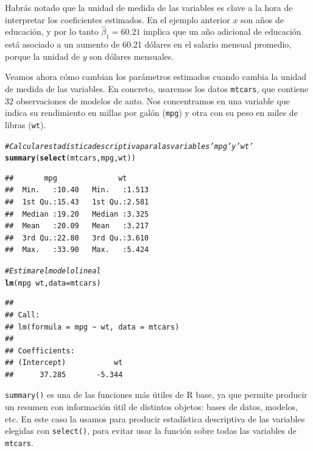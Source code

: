 \documentclass[12pt]{report}\usepackage[]{graphicx}\usepackage[]{color}
\makeatletter
\newcommand{\hlcom}[1]{\textcolor[rgb]{0.678,0.584,0.686}{\textit{#1}}}%
\newcommand{\hlopt}[1]{\textcolor[rgb]{0,0,0}{#1}}%
\newcommand{\hlstd}[1]{\textcolor[rgb]{0.345,0.345,0.345}{#1}}%
\newcommand{\hlkwc}[1]{\textcolor[rgb]{0.333,0.667,0.333}{#1}}%
\newcommand{\hlkwd}[1]{\textcolor[rgb]{0.737,0.353,0.396}{\textbf{#1}}}%
\newenvironment{kframe}{%
 \def\at@end@of@kframe{}%
 \ifinner\ifhmode%
  \def\at@end@of@kframe{\end{minipage}}%
  \begin{minipage}{\columnwidth}%
 \fi\fi%
 \def\FrameCommand##1{\hskip\@totalleftmargin \hskip-\fboxsep
 \colorbox{shadecolor}{##1}\hskip-\fboxsep
     \hskip-\linewidth \hskip-\@totalleftmargin \hskip\columnwidth}%
 \MakeFramed {\advance\hsize-\width
   \@totalleftmargin\z@ \linewidth\hsize
   \@setminipage}}%
 {\par\unskip\endMakeFramed%
 \at@end@of@kframe}
\newenvironment{knitrout}{}{} %
\makeatother
\begin{document}
Habrás notado que la unidad de medida de las variables es clave a la hora de interpretar los coeficientes estimados. En el ejemplo anterior $x$ son años de educación, y por lo tanto $\hat\beta_1 = 60.21$ implica que un año adicional de educación está asociado a un aumento de 60.21 dólares en el salario mensual promedio, porque la unidad de $y$ son dólares mensuales.

Veamos ahora cómo cambian los parámetros estimados cuando cambia la unidad de medida de las variables.
En concreto, usaremos los datos \verb|mtcars|, que contiene 32 observaciones de modelos de auto.
Nos concentramos en una variable que indica su rendimiento en millas por galón (\verb|mpg|) y otra con su peso en miles de libras (\verb|wt|).

\begin{knitrout}
\color{fgcolor}\begin{kframe}
\begin{alltt}
\hlcom{# Calcular estadística descriptiva para las variables 'mpg' y 'wt'}
\hlkwd{summary}\hlstd{(}\hlkwd{select}\hlstd{(mtcars, mpg, wt))}
\end{alltt}
\begin{verbatim}
##       mpg              wt       
##  Min.   :10.40   Min.   :1.513  
##  1st Qu.:15.43   1st Qu.:2.581  
##  Median :19.20   Median :3.325  
##  Mean   :20.09   Mean   :3.217  
##  3rd Qu.:22.80   3rd Qu.:3.610  
##  Max.   :33.90   Max.   :5.424
\end{verbatim}
\begin{alltt}
\hlcom{# Estimar el modelo lineal }
\hlkwd{lm}\hlstd{(mpg} \hlopt{~} \hlstd{wt,} \hlkwc{data} \hlstd{= mtcars)}
\end{alltt}
\begin{verbatim}
## 
## Call:
## lm(formula = mpg ~ wt, data = mtcars)
## 
## Coefficients:
## (Intercept)           wt  
##      37.285       -5.344
\end{verbatim}
\end{kframe}
\end{knitrout}




\begin{Rbox}
\verb|summary()| es una de las funciones más útiles de R base, ya que permite producir un resumen con información útil de distintos objetos: bases de datos, modelos, etc. En este caso la usamos para producir estadística descriptiva de las variables elegidas con \verb|select()|, para evitar usar la función sobre todas las variables de \verb|mtcars|.
\end{Rbox}
\end{document}
